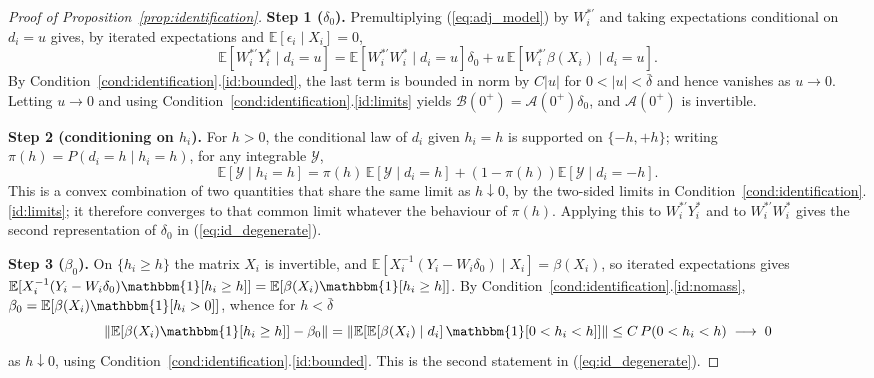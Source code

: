 \documentclass{article}
\newcommand{\normm}[1]{\lVert#1\rVert}
\newcommand{\E}{\mathbb{E}}
\newcommand{\I}{\mathbbm{1}}
\begin{document}
\begin{proof}[Proof of Proposition~\ref{prop:identification}]
\textbf{Step 1 ($\delta_0$).} Premultiplying (\ref{eq:adj_model}) by $W_i^{*\prime}$ and taking expectations conditional on $d_i=u$ gives, by iterated expectations and $\E[\epsilon_i\mid X_i]=0$,
\[
    \E\!\left[W_i^{*\prime}Y_i^{*}\mid d_i=u\right]
    = \E\!\left[W_i^{*\prime}W_i^{*}\mid d_i=u\right]\delta_0
      + u\,\E\!\left[W_i^{*\prime}\beta(X_i)\mid d_i=u\right].
\]
By Condition~\ref{cond:identification}.\ref{id:bounded}, the last term is bounded in norm by $C|u|$ for $0<|u|<\bar\delta$ and hence vanishes as $u\to0$. Letting $u\to0$ and using Condition~\ref{cond:identification}.\ref{id:limits} yields $\mathcal{B}(0^{+})=\mathcal{A}(0^{+})\delta_0$, and $\mathcal{A}(0^{+})$ is invertible.

\textbf{Step 2 (conditioning on $h_i$).} For $h>0$, the conditional law of $d_i$ given $h_i=h$ is supported on $\{-h,+h\}$; writing $\pi(h)=P(d_i=h\mid h_i=h)$, for any integrable $\mathcal{Y}$,
\[
    \E[\mathcal{Y}\mid h_i=h]
    = \pi(h)\,\E[\mathcal{Y}\mid d_i=h] + \left(1-\pi(h)\right)\E[\mathcal{Y}\mid d_i=-h].
\]
This is a convex combination of two quantities that share the same limit as $h\downarrow0$, by the two-sided limits in Condition~\ref{cond:identification}.\ref{id:limits}; it therefore converges to that common limit whatever the behaviour of $\pi(h)$. Applying this to $W_i^{*\prime}Y_i^{*}$ and to $W_i^{*\prime}W_i^{*}$ gives the second representation of $\delta_0$ in (\ref{eq:id_degenerate}).

\textbf{Step 3 ($\beta_0$).} On $\{h_i\ge h\}$ the matrix $X_i$ is invertible, and $\E[X_i^{-1}(Y_i-W_i\delta_0)\mid X_i]=\beta(X_i)$, so iterated expectations gives
$\E[X_i^{-1}(Y_i-W_i\delta_0)\I[h_i\ge h]]=\E[\beta(X_i)\I[h_i\ge h]]$. By Condition~\ref{cond:identification}.\ref{id:nomass}, $\beta_0=\E[\beta(X_i)\I[h_i>0]]$, whence for $h<\bar\delta$
\[
    \normm{\E\!\left[\beta(X_i)\I[h_i\ge h]\right]-\beta_0}
    = \normm{\E\!\left[\E[\beta(X_i)\mid d_i]\,\I[0<h_i< h]\right]}
    \le C\,P(0<h_i<h)\;\longrightarrow\;0
\]
as $h\downarrow0$, using Condition~\ref{cond:identification}.\ref{id:bounded}. This is the second statement in (\ref{eq:id_degenerate}).
\end{proof}

\end{document}
